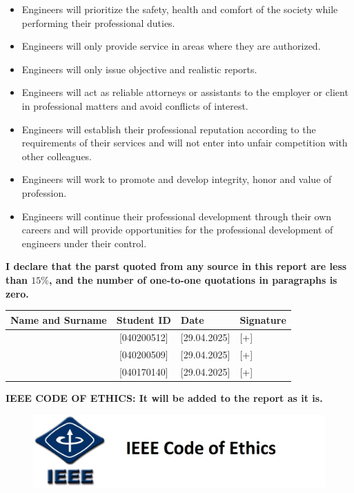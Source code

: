 \begin{itemize}
    \item Engineers will prioritize the safety, health and comfort of the society while performing their professional duties.
    \item Engineers will only provide service in areas where they are authorized.
    \item Engineers will only issue objective and realistic reports.
    \item Engineers will act as reliable attorneys or assistants to the employer or client in professional matters and avoid conflicts of interest.
    \item Engineers will establish their professional reputation according to the requirements of their services and will not enter into unfair competition with other colleagues.
    \item Engineers will work to promote and develop integrity, honor and value of profession.
    \item Engineers will continue their professional development through their own careers and will provide opportunities for the professional development of engineers under their control.
\end{itemize}
%
%
%
%
\clearpage
\textbf{I declare that the parst quoted from any source in this report are less than $15 \%$, and the number of one-to-one quotations in paragraphs is zero.}
%
%
%
\renewcommand{\arraystretch}{2} %
\begin{table}[h]
    \centering
    \begin{tabular}{|l|c|m{3cm}|m{4cm}|} %
        \hline
        \textbf{Name and Surname} & \textbf{Student ID} & \textbf{Date} &\textbf{Signature}\\
        \hline
        [Kürşat Döşkaya] & [040200512] & [29.04.2025] & [+] \\
        \hline
        [Kenan Selçuk] & [040200509] & [29.04.2025] & [+] \\
        \hline
        [Burak Uğur] & [040170140] & [29.04.2025] & [+] \\
        \hline
    \end{tabular}
\end{table}
%
%
\clearpage
\textbf{IEEE CODE OF ETHICS: It will be added to the report as it is.}
%
%
%
\begin{figure}
\centering
\includegraphics[width=0.8\columnwidth]{imgs/IEEE.jpg}
\end{figure}%

